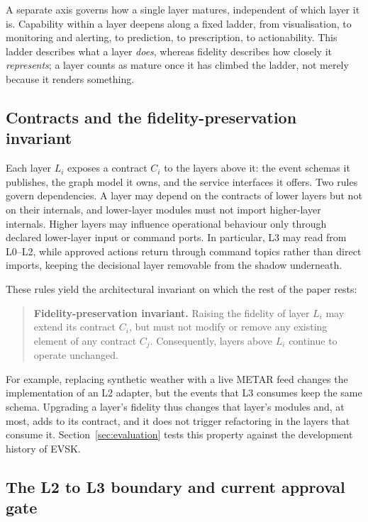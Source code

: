 \documentclass[runningheads]{llncs}
\begin{document}
A separate axis governs how a single layer matures, independent of which layer it is. Capability within a layer deepens along a fixed ladder, from visualisation, to monitoring and alerting, to prediction, to prescription, to actionability. This ladder describes what a layer \emph{does}, whereas fidelity describes how closely it \emph{represents}; a layer counts as mature once it has climbed the ladder, not merely because it renders something.

\subsection{Contracts and the fidelity-preservation invariant}

Each layer $L_i$ exposes a contract $C_i$ to the layers above it: the event schemas it publishes, the graph model it owns, and the service interfaces it offers. Two rules govern dependencies. A layer may depend on the contracts of lower layers but not on their internals, and lower-layer modules must not import higher-layer internals. Higher layers may influence operational behaviour only through declared lower-layer input or command ports. In particular, L3 may read from L0--L2, while approved actions return through command topics rather than direct imports, keeping the decisional layer removable from the shadow underneath.

These rules yield the architectural invariant on which the rest of the paper rests:

\begin{quote}
\textbf{Fidelity-preservation invariant.} Raising the fidelity of layer $L_i$ may extend its contract $C_i$, but must not modify or remove any existing element of any contract $C_j$. Consequently, layers above $L_i$ continue to operate unchanged.
\end{quote}

For example, replacing synthetic weather with a live METAR feed changes the implementation of an L2 adapter, but the events that L3 consumes keep the same schema. Upgrading a layer's fidelity thus changes that layer's modules and, at most, adds to its contract, and it does not trigger refactoring in the layers that consume it. Section~\ref{sec:evaluation} tests this property against the development history of EVSK.

\subsection{The L2 to L3 boundary and current approval gate}
\end{document}
